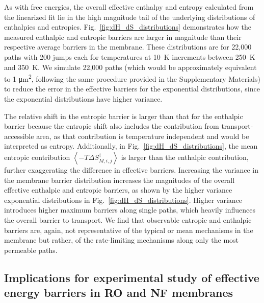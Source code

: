 \documentclass[12pt]{article}
\begin{document}
As with free energies, the overall effective enthalpy and entropy calculated from the linearized fit lie in the high magnitude tail of the underlying distributions of enthalpies and entropies. Fig.~\ref{fig:dH_dS_distributions} demonstrates how the measured enthalpic and entropic barriers are larger in magnitude than their respective average barriers in the membrane. These distributions are for 22,000 paths with 200 jumps each for temperatures at 10~K increments between 250~K and 350~K. We simulate 22,000 paths (which would be approximately equivalent to 1 \unit{\micro\meter\squared}, following the same procedure provided in the Supplementary Materials) to reduce the error in the effective barriers for the exponential distributions, since the exponential distributions have higher variance. 

The relative shift in the entropic barrier is larger than that for the enthalpic barrier because the entropic shift also includes the contribution from transport-accessible area, as that contribution is temperature independent and would be interpreted as entropy. Additionally, in Fig.~\ref{fig:dH_dS_distributions}, the mean entropic contribution $\left< -T\Delta S_{M,i,j}^{\ddagger} \right>$ is larger than the enthalpic contribution, further exaggerating the difference in effective barriers. Increasing the variance in the membrane barrier distribution increases the magnitudes of the overall effective enthalpic and entropic barriers, as shown by the higher variance exponential distributions in Fig.~\ref{fig:dH_dS_distributions}. Higher variance introduces higher maximum barriers along single paths, which heavily influences the overall barrier to transport. We find that observable entropic and enthalpic barriers are, again, not representative of the typical or mean mechanisms in the membrane but rather, of the rate-limiting mechanisms along only the most permeable paths.

\subsection*{Implications for experimental study of effective energy barriers in RO and NF membranes}
\end{document}
